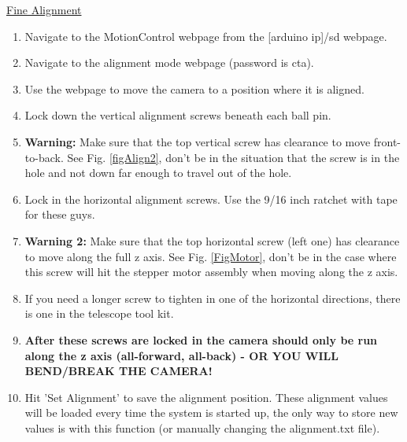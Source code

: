 \documentclass[11pt]{article}
\begin{document}
\underline{Fine Alignment}
\begin{enumerate}
	\item Navigate to the MotionControl webpage from the [arduino ip]/sd webpage.
	\item Navigate to the alignment mode webpage (password is cta).
	\item Use the webpage to move the camera to a position where it is aligned.
	\item Lock down the vertical alignment screws beneath each ball pin.  
	\item {\bf Warning: } Make sure that the top vertical screw has clearance to move front-to-back.  
		See Fig. \ref{figAlign2}, don't be in the situation that the screw is in the hole and not down far enough to travel out of the hole.
	\item Lock in the horizontal alignment screws. 
		Use the 9/16 inch ratchet with tape for these guys.
	\item {\bf Warning 2: } Make sure that the top horizontal screw (left one) has clearance to move along the full z axis.  
		See Fig. \ref{FigMotor}, don't be in the case where this screw will hit the stepper motor assembly when moving along the z axis.
	\item If you need a longer screw to tighten in one of the horizontal directions, there is one in the telescope tool kit.
	\item {\bf After these screws are locked in the camera should only be run along the z axis (all-forward, all-back) - OR YOU WILL BEND/BREAK THE CAMERA!}
	\item Hit 'Set Alignment' to save the alignment position.  These alignment values will be loaded every time the system is started up, the only way to store new values is with this function (or manually changing the alignment.txt file).
\end{enumerate}
\end{document}
